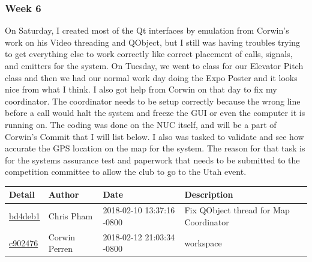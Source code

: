 \subsubsection{Week 6}
On Saturday, I created most of the Qt interfaces by emulation from Corwin's work on his Video threading and QObject, but I still was having troubles trying to get everything else to work correctly like correct placement of calls, signals, and emitters for the system.
On Tuesday, we went to class for our Elevator Pitch class and then we had our normal work day doing the Expo Poster and it looks nice from what I think.
I also got help from Corwin on that day to fix my coordinator.
The coordinator needs to be setup correctly because the wrong line before a call would halt the system and freeze the GUI or even the computer it is running on.
The coding was done on the NUC itself, and will be a part of Corwin's Commit that I will list below.
I also was tasked to validate and see how accurate the GPS location on the map for the system.
The reason for that task is for the systems assurance test and paperwork that needs to be submitted to the competition committee to allow the club to go to the Utah event.
\begin{center}
\begin{tabular}{l l l l}\textbf{Detail} & \textbf{Author} & \textbf{Date} & \textbf{Description}\\\hline
\href{https://github.com/OSURoboticsClub/Rover_2017_2018/commit/bd4deb1b2afef1159783ac5775884bccb595b245}{bd4deb1} & Chris Pham & 2018-02-10 13:37:16 -0800 &Fix QObject thread for Map Coordinator\\\hline
\href{https://github.com/OSURoboticsClub/Rover_2017_2018/commit/c90247643f816b5add089c604804ead6e8a73b3e}{c902476} & Corwin Perren & 2018-02-12 21:03:34 -0800 &workspace\\\hline
\end{tabular}
\end{center}
